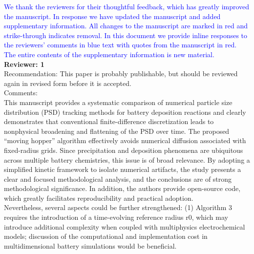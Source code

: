 \documentclass[12 pt]{article}    %
\begin{document}
\noindent\textcolor{blue}{We thank the reviewers for their thoughtful feedback, which has greatly improved the manuscript. In response we have updated the manuscript and added supplementary information. All changes to the manuscript are marked in red and strike-through indicates removal. In this document we provide inline responses to the reviewers’ comments in blue text with quotes from the manuscript in red. The entire contents of the supplementary information is new material.}\\ 

\noindent \textbf{Reviewer: 1}  \\

\noindent Recommendation: This paper is probably publishable, but should be reviewed again in revised form before it is accepted.\\ 

\noindent Comments:\\
This manuscript provides a systematic comparison of numerical particle size distribution (PSD) tracking methods for battery deposition reactions and clearly demonstrates that conventional finite-difference discretization leads to nonphysical broadening and flattening of the PSD over time. The proposed “moving hopper” algorithm effectively avoids numerical diffusion associated with fixed-radius grids. Since precipitation and deposition phenomena are ubiquitous across multiple battery chemistries, this issue is of broad relevance. By adopting a simplified kinetic framework to isolate numerical artifacts, the study presents a clear and focused methodological analysis, and the conclusions are of strong methodological significance. In addition, the authors provide open-source code, which greatly facilitates reproducibility and practical adoption.\\
Nevertheless, several aspects could be further strengthened: (1) Algorithm 3 requires the introduction of a time-evolving reference radius r0, which may introduce additional complexity when coupled with multiphysics electrochemical models; discussion of the computational and implementation cost in multidimensional battery simulations would be beneficial. \\ 
\end{document}
